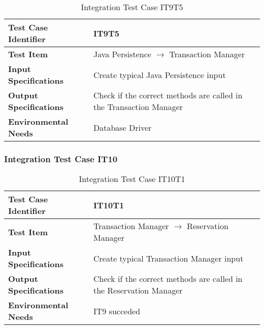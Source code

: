 \begin{table}[htbp]
\begin{center}
\renewcommand{\arraystretch}{1.5}
\begin{tabular}{l|p{}}
\hline
\textbf{Test Case Identifier} & IT9T5\\
\hline
\textbf{Test Item} & Java Persistence $\rightarrow$ Transaction Manager\\
\hline
\textbf{Input Specifications} & Create typical Java Persistence input \\
\hline
\textbf{Output Specifications} & Check if the correct methods are called in the Transaction Manager \\
\hline
\textbf{Environmental Needs} & Database Driver\\
\hline
\end{tabular}
\caption{Integration Test Case IT9T5}
\end{center}
\end{table}

\vspace{10pt}
\subsubsection{Integration Test Case IT10} \label{sssec:IT10}
\vspace{16pt}
\begin{table}[htbp]
\begin{center}
\renewcommand{\arraystretch}{1.5}
\begin{tabular}{l|p{}}
\hline
\textbf{Test Case Identifier} & IT10T1\\
\hline
\textbf{Test Item} & Transaction Manager $\rightarrow$ Reservation Manager\\
\hline
\textbf{Input Specifications} & Create typical Transaction Manager input \\
\hline
\textbf{Output Specifications} & Check if the correct methods are called in the Reservation Manager \\
\hline
\textbf{Environmental Needs} & IT9 succeded\\
\hline
\end{tabular}
\caption{Integration Test Case IT10T1}
\end{center}
\end{table}
\clearpage


